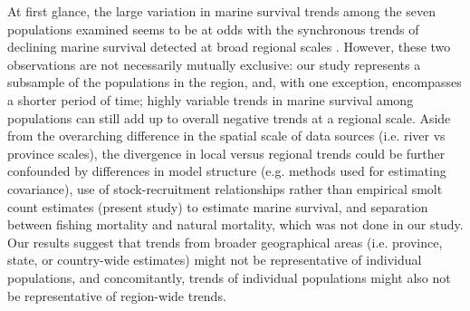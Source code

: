 \documentclass[12pt]{article}
\begin{document}

At first glance, the large variation in marine survival trends among the seven
populations examined seems to be at odds with the synchronous
trends of declining marine survival detected at broad regional scales
\citep{Olmos2019}. However, these two observations are not necessarily mutually
exclusive: our study represents a subsample of the populations in the region,
and, with one exception, encompasses a shorter period of time; highly variable
trends in marine survival among populations can still add
up to overall negative trends at a regional scale.
Aside from the overarching difference in the spatial scale of data sources
(i.e. river vs province scales), the divergence in local versus regional
trends could be further confounded by differences in model structure (e.g.
methods used for estimating covariance), use of stock-recruitment
relationships \citep{Olmos2019} rather than empirical smolt count estimates
(present study) to estimate marine survival, and separation between fishing mortality
and natural mortality, which was not done in our study.
Our results suggest that trends from broader geographical areas (i.e.
province, state, or country-wide estimates) might not be representative of
individual populations, and concomitantly, trends of individual populations
might also not be representative of region-wide trends.
\end{document}
